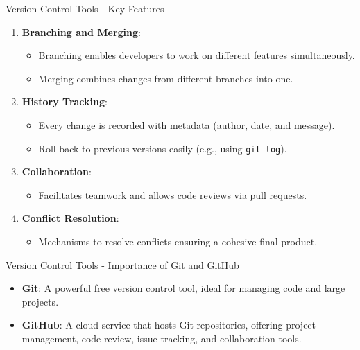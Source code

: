\documentclass[aspectratio=169]{beamer}
\begin{document}
\begin{frame}[fragile]{Version Control Tools - Key Features}
  \begin{enumerate}
    \item \textbf{Branching and Merging}:
      \begin{itemize}
        \item Branching enables developers to work on different features simultaneously.
        \item Merging combines changes from different branches into one. 
      \end{itemize}
    
    \item \textbf{History Tracking}:
      \begin{itemize}
        \item Every change is recorded with metadata (author, date, and message).
        \item Roll back to previous versions easily (e.g., using \texttt{git log}).
      \end{itemize}
    
    \item \textbf{Collaboration}:
      \begin{itemize}
        \item Facilitates teamwork and allows code reviews via pull requests.
      \end{itemize}

    \item \textbf{Conflict Resolution}:
      \begin{itemize}
        \item Mechanisms to resolve conflicts ensuring a cohesive final product.
      \end{itemize}
  \end{enumerate}
\end{frame}

\begin{frame}[fragile]{Version Control Tools - Importance of Git and GitHub}
  \begin{itemize}
    \item \textbf{Git}: A powerful free version control tool, ideal for managing code and large projects.
    \item \textbf{GitHub}: A cloud service that hosts Git repositories, offering project management, code review, issue tracking, and collaboration tools.
  \end{itemize}
\end{frame}
\end{document}
